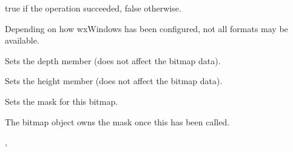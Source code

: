 

true if the operation succeeded, false otherwise.


Depending on how wxWindows has been configured, not all formats may be available.



\label{wxbitmapsetdepth}


Sets the depth member (does not affect the bitmap data).



\label{wxbitmapsetheight}


Sets the height member (does not affect the bitmap data).



\label{wxbitmapsetmask}


Sets the mask for this bitmap.


The bitmap object owns the mask once this has been called.


, 


\label{wxbitmapsetpalette}


